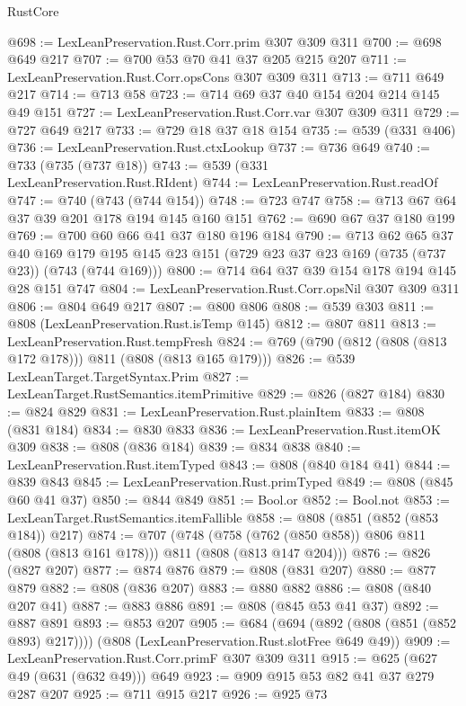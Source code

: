 \begin{lexlean}{RustCore}
\begin{coremodule}
@698 := LexLeanPreservation.Rust.Corr.prim @307 @309 @311
@700 := @698 @649 @217
@707 := @700 @53 @70 @41 @37 @205 @215 @207
@711 := LexLeanPreservation.Rust.Corr.opsCons @307 @309 @311
@713 := @711 @649 @217
@714 := @713 @58
@723 := @714 @69 @37 @40 @154 @204 @214 @145 @49 @151
@727 := LexLeanPreservation.Rust.Corr.var @307 @309 @311
@729 := @727 @649 @217
@733 := @729 @18 @37 @18 @154
@735 := @539 (@331 @406)
@736 := LexLeanPreservation.Rust.ctxLookup
@737 := @736 @649
@740 := @733 (@735 (@737 @18))
@743 := @539 (@331 LexLeanPreservation.Rust.RIdent)
@744 := LexLeanPreservation.Rust.readOf
@747 := @740 (@743 (@744 @154))
@748 := @723 @747
@758 := @713 @67 @64 @37 @39 @201 @178 @194 @145 @160 @151
@762 := @690 @67 @37 @180 @199
@769 := @700 @60 @66 @41 @37 @180 @196 @184
@790 := @713
    @62
    @65
    @37
    @40
    @169
    @179
    @195
    @145
    @23
    @151
    (@729 @23 @37 @23 @169 (@735 (@737 @23)) (@743 (@744 @169)))
@800 := @714 @64 @37 @39 @154 @178 @194 @145 @28 @151 @747
@804 := LexLeanPreservation.Rust.Corr.opsNil @307 @309 @311
@806 := @804 @649 @217
@807 := @800 @806
@808 := @539 @303
@811 := @808 (LexLeanPreservation.Rust.isTemp @145)
@812 := @807 @811
@813 := LexLeanPreservation.Rust.tempFresh
@824 := @769 (@790 (@812 (@808 (@813 @172 @178))) @811 (@808 (@813 @165 @179)))
@826 := @539 LexLeanTarget.TargetSyntax.Prim
@827 := LexLeanTarget.RustSemantics.itemPrimitive
@829 := @826 (@827 @184)
@830 := @824 @829
@831 := LexLeanPreservation.Rust.plainItem
@833 := @808 (@831 @184)
@834 := @830 @833
@836 := LexLeanPreservation.Rust.itemOK @309
@838 := @808 (@836 @184)
@839 := @834 @838
@840 := LexLeanPreservation.Rust.itemTyped
@843 := @808 (@840 @184 @41)
@844 := @839 @843
@845 := LexLeanPreservation.Rust.primTyped
@849 := @808 (@845 @60 @41 @37)
@850 := @844 @849
@851 := Bool.or
@852 := Bool.not
@853 := LexLeanTarget.RustSemantics.itemFallible
@858 := @808 (@851 (@852 (@853 @184)) @217)
@874 := @707
    (@748 (@758 (@762 (@850 @858)) @806 @811 (@808 (@813 @161 @178))) @811 (@808 (@813 @147 @204)))
@876 := @826 (@827 @207)
@877 := @874 @876
@879 := @808 (@831 @207)
@880 := @877 @879
@882 := @808 (@836 @207)
@883 := @880 @882
@886 := @808 (@840 @207 @41)
@887 := @883 @886
@891 := @808 (@845 @53 @41 @37)
@892 := @887 @891
@893 := @853 @207
@905 := @684
    (@694 (@892 (@808 (@851 (@852 @893) @217))))
    (@808 (LexLeanPreservation.Rust.slotFree @649 @49))
@909 := LexLeanPreservation.Rust.Corr.primF @307 @309 @311
@915 := @625 (@627 @49 (@631 (@632 @49))) @649
@923 := @909 @915 @53 @82 @41 @37 @279 @287 @207
@925 := @711 @915 @217
@926 := @925 @73

\end{coremodule}
\end{lexlean}
